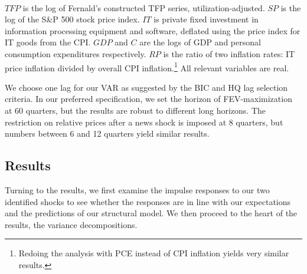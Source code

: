 \documentclass[11pt]{article}
\renewcommand{\[}{\begin{equation}}
\renewcommand{\]}{\end{equation}}
\begin{document}
	\
	
	
$TFP$ is the log of Fernald's constructed TFP series, utilization-adjusted. $SP$ is the log of the S\&P 500 stock price index. $IT$ is private fixed investment in information processing equipment and software, deflated using the price index for IT goods from the CPI. $GDP$ and $C$ are the logs of GDP and personal consumption expenditures respectively. $RP$ is the ratio of two inflation rates: IT price inflation divided by overall CPI inflation.\footnote{Redoing the analysis with PCE instead of CPI inflation yields very similar results.} All relevant variables are real. 

We choose one lag for our VAR as suggested by the BIC and HQ lag selection criteria. In our preferred specification, we set the horizon of FEV-maximization at 60 quarters, but the results are robust to different long horizons. The restriction on relative prices after a news shock is imposed at 8 quarters, but numbers between 6 and 12 quarters yield similar results.


\subsection{Results}

Turning to the results, we first examine the impulse responses to our two identified shocks to see whether the responses are in line with our expectations and the predictions of our structural model. We then proceed to the heart of the results, the variance decompositions.
\end{document}
